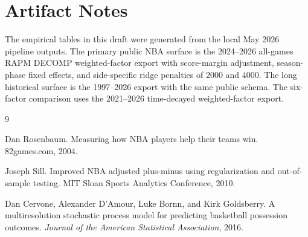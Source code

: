 \documentclass[11pt]{article}
\begin{document}
\section{Artifact Notes}

The empirical tables in this draft were generated from the local May 2026
pipeline outputs.  The primary public NBA surface is the 2024--2026 all-games
RAPM DECOMP weighted-factor export with score-margin adjustment, season-phase
fixed effects, and side-specific ridge penalties of 2000 and 4000.  The long
historical surface is the 1997--2026 export with the same public schema.  The
six-factor comparison uses the 2021--2026 time-decayed weighted-factor export.

\begin{thebibliography}{9}

Dan Rosenbaum.
\newblock Measuring how NBA players help their teams win.
\newblock 82games.com, 2004.

Joseph Sill.
\newblock Improved NBA adjusted plus-minus using regularization and
out-of-sample testing.
\newblock MIT Sloan Sports Analytics Conference, 2010.

Dan Cervone, Alexander D'Amour, Luke Bornn, and Kirk Goldsberry.
\newblock A multiresolution stochastic process model for predicting basketball
possession outcomes.
\newblock \emph{Journal of the American Statistical Association}, 2016.

\end{thebibliography}
\end{document}
